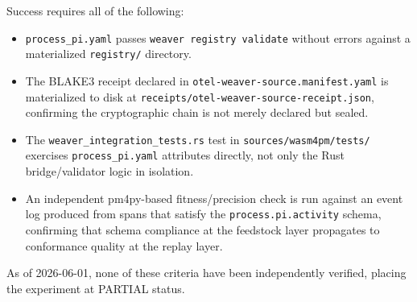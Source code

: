 Success requires all of the following:
\begin{itemize}
  \item \texttt{process\_pi.yaml} passes \texttt{weaver registry validate} without errors
        against a materialized \texttt{registry/} directory.
  \item The BLAKE3 receipt declared in \texttt{otel-weaver-source.manifest.yaml} is materialized
        to disk at \texttt{receipts/otel-weaver-source-receipt.json}, confirming the cryptographic
        chain is not merely declared but sealed.
  \item The \texttt{weaver\_integration\_tests.rs} test in \texttt{sources/wasm4pm/tests/}
        exercises \texttt{process\_pi.yaml} attributes directly, not only the Rust bridge/validator
        logic in isolation.
  \item An independent pm4py-based fitness/precision check is run against an event log produced
        from spans that satisfy the \texttt{process.pi.activity} schema, confirming that schema
        compliance at the feedstock layer propagates to conformance quality at the replay layer.
\end{itemize}
As of 2026-06-01, none of these criteria have been independently verified, placing the experiment
at PARTIAL status.
